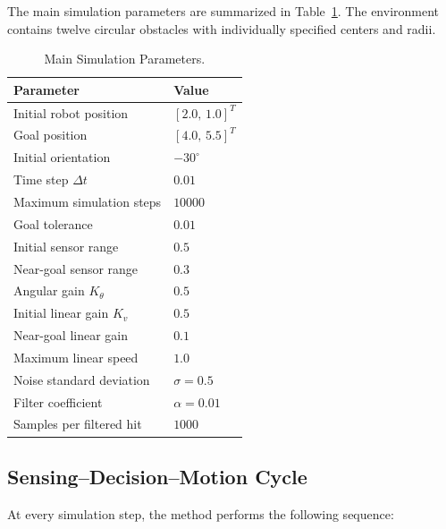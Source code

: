 \documentclass[10pt,twocolumn,a4paper]{article}
\begin{document}
The main simulation parameters are summarized in
Table~\ref{tab:simulation_parameters}. The environment contains twelve
circular obstacles with individually specified centers and radii.

\begin{table}[htbp]
\centering
\caption{Main Simulation Parameters.}
\label{tab:simulation_parameters}
\small
\begin{tabular}{ll}
\toprule
\textbf{Parameter} & \textbf{Value} \\
\midrule
Initial robot position & $[2.0,\,1.0]^T$ \\
Goal position & $[4.0,\,5.5]^T$ \\
Initial orientation & $-30^{\circ}$ \\
Time step $\Delta t$ & $0.01$ \\
Maximum simulation steps & $10000$ \\
Goal tolerance & $0.01$ \\
Initial sensor range & $0.5$ \\
Near-goal sensor range & $0.3$ \\
Angular gain $K_{\theta}$ & $0.5$ \\
Initial linear gain $K_v$ & $0.5$ \\
Near-goal linear gain & $0.1$ \\
Maximum linear speed & $1.0$ \\
Noise standard deviation & $\sigma=0.5$ \\
Filter coefficient & $\alpha=0.01$ \\
Samples per filtered hit & $1000$ \\
\bottomrule
\end{tabular}
\end{table}

\subsection{Sensing--Decision--Motion Cycle}

At every simulation step, the method performs the following sequence:
\end{document}
